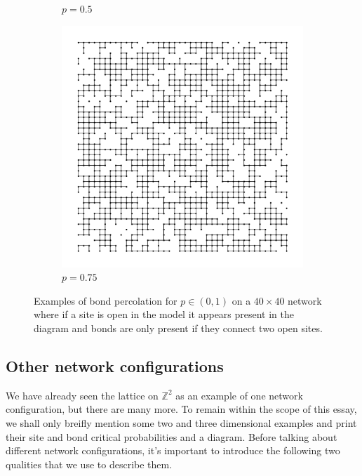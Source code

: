 \begin{figure}[p]
\begin{subfigure}[b]{0.45\textwidth}
    \caption{$p=0.5$}
    \label{fig:p=0.5}
  \end{subfigure}
  \hfill
  \begin{subfigure}[b]{0.45\textwidth}
    \centering
    \includegraphics[width=\textwidth]{1/percolation3}
    \caption{$p=0.75$}
    \label{fig:p=0.75}
  \end{subfigure}
  \caption{Examples of bond percolation for $p\in(0,1)$ on a $40 \times 40$ network where if a site is open in the model it appears present in the diagram and bonds are only
  present if they connect two open sites.}
  \label{fig:probabilities}
\end{figure}

\subsection{Other network configurations}
We have already seen the lattice on $\mathbb{Z}^2$ as an example of one network configuration, but there are many more. To remain within the scope of this essay, we shall only breifly mention some two and
three dimensional examples and print their site and bond critical probabilities and a diagram. Before talking about different network configurations, it's important to introduce the
following two qualities that we use to describe them.

